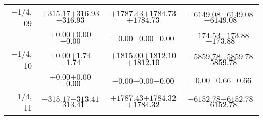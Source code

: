 \documentclass[compress]{beamer}
\begin{document}
\begin{frame}
{\begin{tabular}{r | c | c | c}
$-$1/4, 09 & $+315.17$\hspace{0.1 cm}$+316.93$\hspace{0.1 cm}\textcolor{black}{$+316.93$} & $+1787.43$\hspace{0.1 cm}$+1784.73$\hspace{0.1 cm}\textcolor{black}{$+1784.73$} & $-6149.08$\hspace{0.1 cm}$-6149.08$\hspace{0.1 cm}\textcolor{black}{$-6149.08$} \\
           & $+0.00$\hspace{0.1 cm}$+0.00$\hspace{0.1 cm}\textcolor{black}{$+0.00$} & $-0.00$\hspace{0.1 cm}$-0.00$\hspace{0.1 cm}\textcolor{black}{$-0.00$} & $-174.53$\hspace{0.1 cm}$-173.88$\hspace{0.1 cm}\textcolor{black}{$-173.88$} \\
$-$1/4, 10 & $+0.00$\hspace{0.1 cm}$+1.74$\hspace{0.1 cm}\textcolor{black}{$+1.74$} & $+1815.00$\hspace{0.1 cm}$+1812.10$\hspace{0.1 cm}\textcolor{black}{$+1812.10$} & $-5859.78$\hspace{0.1 cm}$-5859.78$\hspace{0.1 cm}\textcolor{black}{$-5859.78$} \\
           & $+0.00$\hspace{0.1 cm}$+0.00$\hspace{0.1 cm}\textcolor{black}{$+0.00$} & $-0.00$\hspace{0.1 cm}$-0.00$\hspace{0.1 cm}\textcolor{black}{$-0.00$} & $-0.00$\hspace{0.1 cm}$+0.66$\hspace{0.1 cm}\textcolor{black}{$+0.66$} \\
$-$1/4, 11 & $-315.17$\hspace{0.1 cm}$-313.41$\hspace{0.1 cm}\textcolor{black}{$-313.41$} & $+1787.43$\hspace{0.1 cm}$+1784.32$\hspace{0.1 cm}\textcolor{black}{$+1784.32$} & $-6152.78$\hspace{0.1 cm}$-6152.78$\hspace{0.1 cm}\textcolor{black}{$-6152.78$} \\

\end{tabular}}
\end{frame}
\end{document}
